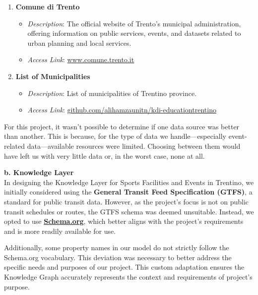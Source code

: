 \begin{enumerate}
    \item \textbf{Comune di Trento}
    \begin{itemize}
        \item \textit{Description}: The official website of Trento's municipal administration, offering information on public services, events, and datasets related to urban planning and local services.
        \item \textit{Access Link}: \href{https://www.comune.trento.it/Aree-tematiche/}{www.comune.trento.it}
    \end{itemize}

    \item \textbf{List of Municipalities}
    \begin{itemize}
        \item \textit{Description}: List of municipalities of Trentino province.
        \item \textit{Access Link}: \href{https://github.com/alihamzaunitn/kdi-educationtrentino/blob/master/Datasets/Data%20Integration/Trentino%20Commune%20List.csv}{github.com/alihamzaunitn/kdi-educationtrentino}
    \end{itemize}
    
\end{enumerate}
\noindent For this project, it wasn’t possible to determine if one data source was better than another. This is because, for the type of data we handle—especially event-related data—available resources were limited. Choosing between them would have left us with very little data or, in the worst case, none at all.
\vspace{0.4cm}

\noindent\textbf{b. Knowledge Layer\\}
\noindent In designing the Knowledge Layer for Sports Facilities and Events in Trentino, we initially considered using the \textbf{General Transit Feed Specification (GTFS)}, a standard for public transit data. However, as the project's focus is not on public transit schedules or routes, the GTFS schema was deemed unsuitable. Instead, we opted to use \href{https://schema.org/docs/schemas.html}{\textbf{Schema.org}}, which better aligns with the project's requirements and is more readily available for use. 

\vspace{0.4cm}
\noindent Additionally, some property names in our model do not strictly follow the Schema.org vocabulary. This deviation was necessary to better address the specific needs and purposes of our project. This custom adaptation ensures the Knowledge Graph accurately represents the context and requirements of project's purpose.

